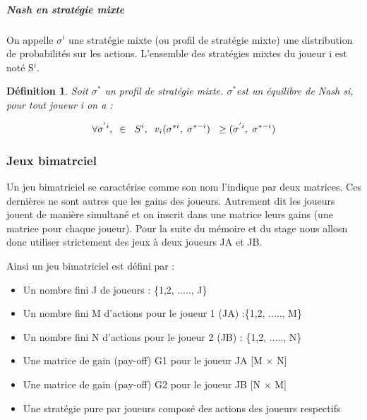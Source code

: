\documentclass[a4paper, 12pt, twoside]{article}
\newtheorem{definition}{Définition}
\begin{document}
\subparagraph{Nash en stratégie mixte}{On appelle $\sigma^{i}$  une stratégie mixte (ou profil de stratégie mixte) une distribution de probabilités sur les actions. L’ensemble des stratégies mixtes du joueur i est noté S$^{i}$.}
\begin{definition}
Soit $\sigma ^{*} $ un profil de stratégie mixte. $\sigma ^{*} $est un équilibre de Nash si, pour tout joueur i on a : 
\end{definition}
\begin{align*}
\forall \sigma ^{'i}, \hspace{0,2 cm} \in \hspace{0,2 cm} S^{i}, \hspace{0,2 cm} v_{i}(\sigma ^{*i} , \hspace{0,1 cm} \sigma^{*-i}) \hspace{0,2 cm} \geq (\sigma ^{'i} , \hspace{0,1 cm} \sigma^{*-i})
\end{align*}


\subsubsection{Jeux bimatrciel}
Un jeu bimatriciel se caractérise comme son nom l'indique par deux matrices. Ces dernières ne sont autres que les gains des joueurs. Autrement dit les joueurs jouent de manière simultané et on inscrit dans une matrice leurs gains (une matrice pour chaque joueur). Pour la suite du mémoire et du stage nous allosn donc utiliser strictement des jeux à deux joueurs JA et JB.

Ainsi un \textsf{jeu bimatriciel} est défini par :
\begin{itemize}
\item Un nombre fini J de joueurs : \{1,2, ....., J\}
\item Un nombre fini M d'actions pour le joueur 1 (JA) :\{1,2, ....., M\}
\item Un nombre fini N d'actions pour le joueur 2 (JB) : \{1,2, ....., N\}
\item Une matrice de gain (pay-off) G1 pour le joueur JA  [M $\times$ N]
\item Une matrice de gain (pay-off) G2 pour le joueur JB  [N $\times$ M]
\item Une stratégie pure par joueurs composé des actions des joueurs respectifs
\end{itemize}
\end{document}
